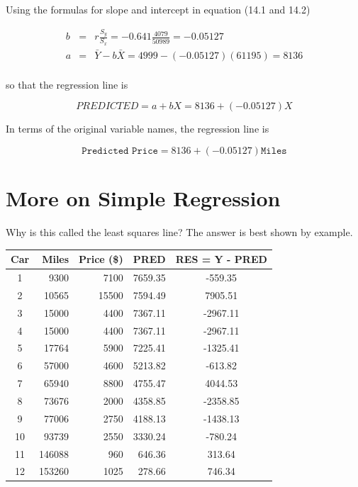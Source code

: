 \documentclass[11pt, chapterprefix=true]{scrbook}\usepackage[]{graphicx}\usepackage[]{color}
\begin{document}
Using the formulas for slope and intercept in equation (14.1 and 14.2)

\begin{eqnarray*}
b &=& r \frac{S_y}{S_x} = -0.641 \frac{4079}{50989} = -0.05127 \\
a &=& \bar{Y} - b \bar{X} = 4999 - (-0.05127)(61195) = 8136  \\
\end{eqnarray*}

so that the regression line is

\begin{equation*}
PREDICTED = a + b X = 8136 + (-0.05127) X
\end{equation*}

In terms of the original variable names, the regression line is

\begin{equation*}
  \texttt{Predicted Price} = 8136 + (-0.05127) \texttt{Miles} 
\end{equation*}

\section{More on Simple Regression}

Why is this called the least squares line?  The answer is best shown by example.

\begin{table}[ht]


\centering 
\begin{tabular}{@{} c rrrc @{}} \hline 
Car & Miles & Price (\$) & PRED & RES = Y - PRED    \\ \hline
1 & 9300 & 7100 & 7659.35 & -559.35 \\
2 & 10565 & 15500 & 7594.49 & 7905.51 \\
3 & 15000 & 4400 & 7367.11 & -2967.11 \\
4 & 15000 & 4400 & 7367.11 & -2967.11 \\
5 & 17764 & 5900 & 7225.41 & -1325.41 \\
6 & 57000 & 4600 & 5213.82 & -613.82 \\
7 & 65940 & 8800 & 4755.47 & 4044.53 \\
8 & 73676 & 2000 & 4358.85 & -2358.85 \\
9 & 77006 & 2750 & 4188.13 & -1438.13 \\
10 & 93739 & 2550 & 3330.24 & -780.24 \\
11 & 146088 & 960 & 646.36 & 313.64 \\
12 & 153260 & 1025 & 278.66 & 746.34 \\ \hline
\end{tabular}
\end{table}
\end{document}
